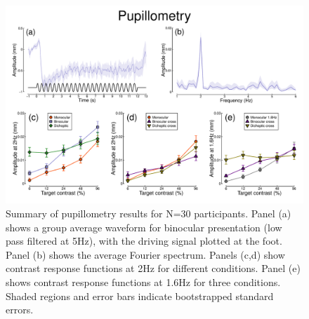 \documentclass[
]{article}
\begin{document}
\begin{figure}

{\centering \includegraphics{Figures/pupildata} 

}

\caption{Summary of pupillometry results for N=30 participants. Panel (a) shows a group average waveform for binocular presentation (low pass filtered at 5Hz), with the driving signal plotted at the foot. Panel (b) shows the average Fourier spectrum. Panels (c,d) show contrast response functions at 2Hz for different conditions. Panel (e) shows contrast response functions at 1.6Hz for three conditions. Shaded regions and error bars indicate bootstrapped standard errors.}\label{fig:pupildata}
\end{figure}
\end{document}
